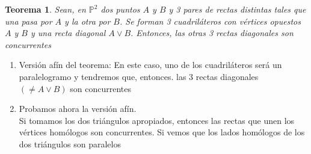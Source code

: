 \documentclass[11pt, a4paper]{article}
\makeatletter
\newif\IfInSansMode
\let\oldsf\sffamily
\renewcommand*{\sffamily}{\oldsf\mathversion{sans}\InSansModetrue}
\let\oldnorm\normalfont
\renewcommand*{\normalfont}{\oldnorm\InSansModefalse\mathversion{normal}}
\renewenvironment{proof}[1][\proofname] {\vspace{-15pt}\par\pushQED{\qed}\normalfont\topsep6\p@\@plus6\p@\relax\trivlist\item[\hskip\labelsep\it#1\@addpunct{.}]\ignorespaces}{\popQED\endtrivlist\@endpefalse}
\renewenvironment{proof}[1][\proofname] {\par\pushQED{\qed}\normalfont\topsep6\p@\@plus6\p@\relax\trivlist\item[\hskip\labelsep\itshape\sffamily#1\@addpunct{.}]\ignorespaces}{\popQED\endtrivlist\@endpefalse}
\theoremstyle{theorem-style}
\newtheorem{nth}{Teorema}[section]
\theoremstyle{definition-style}
\theoremstyle{remark-style}
\theoremstyle{example-style}
\newenvironment{nlist}
{\begin{enumerate}
    \renewcommand\labelenumi{(\emph{\roman{enumi})}}}
  {\end{enumerate}}
\makeatother
\begin{document}
\begin{nth}
Sean, en $\mathbb P^2$ dos puntos $A$ y $B$ y 3 pares de rectas distintas tales que una pasa por $A$ y la otra por $B$. Se forman 3 cuadriláteros con vértices opuestos $A$ y $B$ y una recta diagonal $A\vee B$. Entonces, las otras 3 rectas diagonales son concurrentes
\end{nth}

\begin{proof}
	\begin{nlist}
	\item Versión afín del teorema: En este caso, uno de los cuadriláteros será un paralelogramo y tendremos que, entonces. las 3 rectas diagonales $(\ne A\vee B)$ son concurrentes
	\item Probamos ahora la versión afín.\\
	Si tomamos los dos triángulos apropiados, entonces las rectas que unen los vértices homólogos son concurrentes. Si vemos que los lados homólogos de los dos triángulos son paralelos
\end{nlist}
\end{proof}
\end{document}
